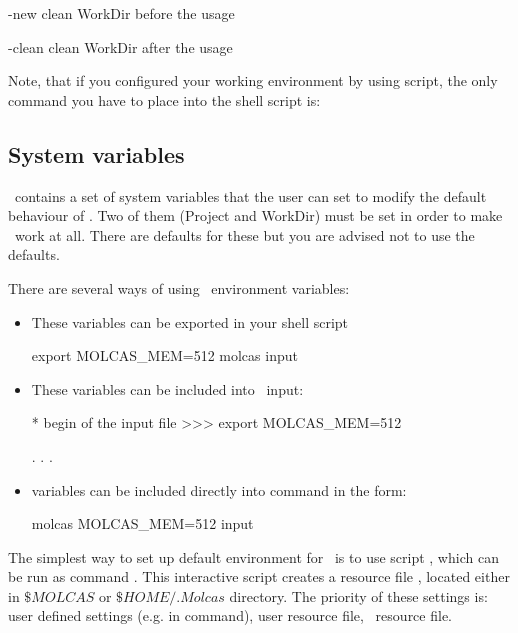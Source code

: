 \begin{variablelist}
\item[-new]
clean WorkDir before the usage

\item[-clean]
clean WorkDir after the usage
\end{variablelist}

Note, that if you configured your working environment by using  script,
the only command you have to place into the shell script is:

\subsection{System variables}
\label{UG:sec:sysvar}

\molcas\ contains a set of system variables that the user can
set to modify the default behaviour of \molcas. Two of them
(Project and WorkDir) must be set in order to make \molcas\ work at all.
There are defaults for these but you are advised not to use the defaults.

There are several ways of using \molcas\ environment variables:
\begin{itemize}
\item These variables can be exported in your shell script
\begin{sourcelisting}
export MOLCAS_MEM=512
molcas input
\end{sourcelisting}
\item These variables can be included into \molcas\ input:
\begin{sourcelisting}
* begin of the input file
>>> export MOLCAS_MEM=512

  . . .
\end{sourcelisting}
\item variables can be included directly into  command in the form:
\begin{sourcelisting}
molcas MOLCAS_MEM=512 input
\end{sourcelisting}
\end{itemize}

The simplest way to set up default environment for \molcas\ is
to use script , which can be run as command
. This interactive script creates
a resource file , located either in $\$MOLCAS$ or $\$HOME/.Molcas$
directory. The priority of these settings is: user defined settings
(e.g. in  command), user resource file, \molcas\ resource file.

